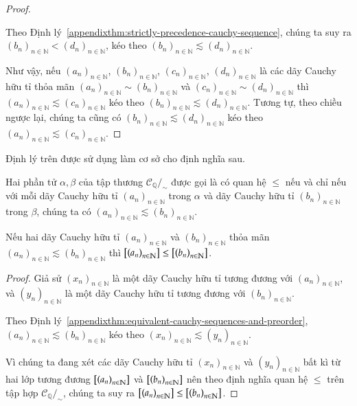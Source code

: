 \begin{proof}
\begin{enumerate}[label={\textbf{Trường hợp \arabic*.}},itemindent=2cm]
              Theo Định lý~\ref{appendixthm:strictly-precedence-cauchy-sequence}, chúng ta suy ra ${(b_{n})}_{n\in\mathbb{N}} < {(d_{n})}_{n\in\mathbb{N}}$, kéo theo ${(b_{n})}_{n\in\mathbb{N}}\lesssim {(d_{n})}_{n\in\mathbb{N}}$.
    \end{enumerate}

    Như vậy, nếu ${(a_{n})}_{n\in\mathbb{N}}$, ${(b_{n})}_{n\in\mathbb{N}}$, ${(c_{n})}_{n\in\mathbb{N}}$, ${(d_{n})}_{n\in\mathbb{N}}$ là các dãy Cauchy hữu tỉ thỏa mãn ${(a_{n})}_{n\in\mathbb{N}}\sim {(b_{n})}_{n\in\mathbb{N}}$ và ${(c_{n})}_{n\in\mathbb{N}}\sim {(d_{n})}_{n\in\mathbb{N}}$ thì ${(a_{n})}_{n\in\mathbb{N}}\lesssim {(c_{n})}_{n\in\mathbb{N}}$ kéo theo ${(b_{n})}_{n\in\mathbb{N}}\lesssim {(d_{n})}_{n\in\mathbb{N}}$. Tương tự, theo chiều ngược lại, chúng ta cũng có ${(b_{n})}_{n\in\mathbb{N}}\lesssim {(d_{n})}_{n\in\mathbb{N}}$ kéo theo ${(a_{n})}_{n\in\mathbb{N}}\lesssim {(c_{n})}_{n\in\mathbb{N}}$.
\end{proof}

Định lý trên được sử dụng làm cơ sở cho định nghĩa sau.
\begin{definition}
    Hai phần tử $\alpha, \beta$ của tập thương $\mathscr{C}_{\mathbb{Q}}/_{\sim}$ được gọi là có quan hệ $\leq$ nếu và chỉ nếu với mỗi dãy Cauchy hữu tỉ ${(a_{n})}_{n\in\mathbb{N}}$ trong $\alpha$ và dãy Cauchy hữu tỉ ${(b_{n})}_{n\in\mathbb{N}}$ trong $\beta$, chúng ta có ${(a_{n})}_{n\in\mathbb{N}}\lesssim {(b_{n})}_{n\in\mathbb{N}}$.
\end{definition}

\begin{appendixthm}\label{appendixthm:preorder-to-order}
    Nếu hai dãy Cauchy hữu tỉ ${(a_{n})}_{n\in\mathbb{N}}$ và ${(b_{n})}_{n\in\mathbb{N}}$ thỏa mãn ${(a_{n})}_{n\in\mathbb{N}}\lesssim {(b_{n})}_{n\in\mathbb{N}}$ thì $\left[{\left({a_{n}}\right)}_{{n}\in\mathbb{N}}\right]\leq \left[{\left({b_{n}}\right)}_{{n}\in\mathbb{N}}\right]$.
\end{appendixthm}

\begin{proof}
    Giả sử ${(x_{n})}_{n\in\mathbb{N}}$ là một dãy Cauchy hữu tỉ tương đương với ${(a_{n})}_{n\in\mathbb{N}}$, và ${(y_{n})}_{n\in\mathbb{N}}$ là một dãy Cauchy hữu tỉ tương đương với ${(b_{n})}_{n\in\mathbb{N}}$.

    Theo Định lý~\ref{appendixthm:equivalent-cauchy-sequences-and-preorder}, ${(a_{n})}_{n\in\mathbb{N}}\lesssim {(b_{n})}_{n\in\mathbb{N}}$ kéo theo ${(x_{n})}_{n\in\mathbb{N}}\lesssim {(y_{n})}_{n\in\mathbb{N}}$.

    Vì chúng ta đang xét các dãy Cauchy hữu tỉ ${(x_{n})}_{n\in\mathbb{N}}$ và ${(y_{n})}_{n\in\mathbb{N}}$ bất kì từ hai lớp tương đương $\left[{\left({a_{n}}\right)}_{{n}\in\mathbb{N}}\right]$ và $\left[{\left({b_{n}}\right)}_{{n}\in\mathbb{N}}\right]$ nên theo định nghĩa quan hệ $\leq$ trên tập hợp $\mathscr{C}_{\mathbb{Q}}/_{\sim}$, chúng ta suy ra $\left[{\left({a_{n}}\right)}_{{n}\in\mathbb{N}}\right]\leq \left[{\left({b_{n}}\right)}_{{n}\in\mathbb{N}}\right]$.
\end{proof}

